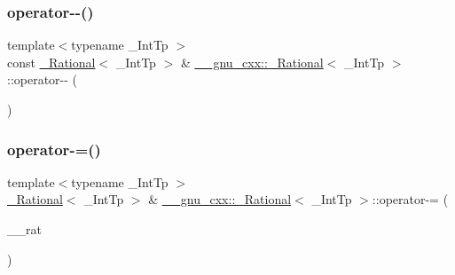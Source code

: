 \subsubsection{\texorpdfstring{operator-\/-\/()}{operator--()}}
{\footnotesize\ttfamily template$<$typename \+\_\+\+Int\+Tp $>$ \\
const \hyperlink{class____gnu__cxx_1_1__Rational}{\+\_\+\+Rational}$<$ \+\_\+\+Int\+Tp $>$ \& \hyperlink{class____gnu__cxx_1_1__Rational}{\+\_\+\+\_\+gnu\+\_\+cxx\+::\+\_\+\+Rational}$<$ \+\_\+\+Int\+Tp $>$\+::operator-\/-\/ (\begin{DoxyParamCaption}{ }\end{DoxyParamCaption})\hspace{0.3cm}{\ttfamily [inline]}}

\mbox{\label{class____gnu__cxx_1_1__Rational_a4f35f8769205a9df35b3783b42b24bfd}} 
\subsubsection{\texorpdfstring{operator-\/=()}{operator-=()}\hspace{0.1cm}{\footnotesize\ttfamily [1/2]}}
{\footnotesize\ttfamily template$<$typename \+\_\+\+Int\+Tp $>$ \\
\hyperlink{class____gnu__cxx_1_1__Rational}{\+\_\+\+Rational}$<$ \+\_\+\+Int\+Tp $>$ \& \hyperlink{class____gnu__cxx_1_1__Rational}{\+\_\+\+\_\+gnu\+\_\+cxx\+::\+\_\+\+Rational}$<$ \+\_\+\+Int\+Tp $>$\+::operator-\/= (\begin{DoxyParamCaption}\item[{\hyperlink{class____gnu__cxx_1_1__Rational}{\+\_\+\+Rational}$<$ \+\_\+\+Int\+Tp $>$}]{\+\_\+\+\_\+rat }\end{DoxyParamCaption})}

\mbox{\label{class____gnu__cxx_1_1__Rational_adb892cfe28022c6f8ffe189d25f36e1e}} 
